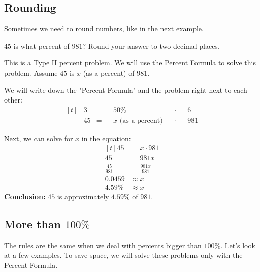 \subsection{Rounding}
Sometimes we need to round numbers, like in the next example.
\begin{myexample}
$45$ is what percent of $981$? Round your answer to two decimal places.
\end{myexample}
\begin{solution}

This is a Type II percent problem. We will use the Percent Formula to solve this problem. Assume $45$ is $x$ (as a percent) of $981$.

We will write down the "Percent Formula" and the problem right next to each other:
\[
\begin{aligned}[t]
	&3 &= &&50\% &&\cdot &&6 \\
	&45 &= &&x \text{ (as a percent)} &&\cdot &&981
\end{aligned}
\]

Next, we can solve for $x$ in the equation:
\[
\begin{aligned}[t]
	45 &= x \cdot 981 \\
	45 &= 981x \\
	\frac{45}{981} &= \frac{981x}{981} \\
	0.0459 &\approx x \\
	4.59\% &\approx x
\end{aligned}
\]
\textbf{Conclusion:} $45$ is approximately $4.59\%$ of $981$.

\end{solution}

\subsection{More than $100\%$}
The rules are the same when we deal with percents bigger than $100\%$. Let's look at a few examples. To save space, we will solve these problems only with the Percent Formula.

